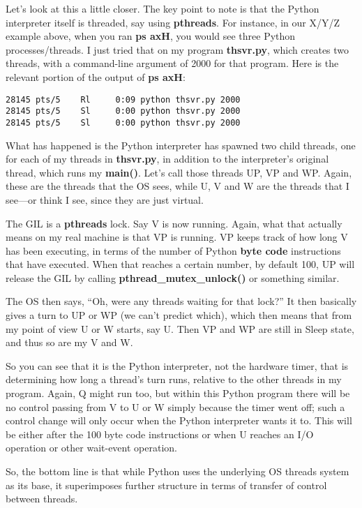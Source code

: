 Let's look at this a little closer.  The key point to note is that the
Python interpreter itself is threaded, say using {\bf pthreads}.  For
instance, in our X/Y/Z example above, when you ran {\bf ps axH}, you
would see three Python processes/threads.  I just tried that on my
program {\bf thsvr.py}, which creates two threads, with a command-line
argument of 2000 for that program.  Here is the relevant portion of the
output of {\bf ps axH}:

\begin{Verbatim}[fontsize=\relsize{-2}]
28145 pts/5    Rl     0:09 python thsvr.py 2000
28145 pts/5    Sl     0:00 python thsvr.py 2000
28145 pts/5    Sl     0:00 python thsvr.py 2000
\end{Verbatim}

What has happened is the Python interpreter has spawned two child
threads, one for each of my threads in {\bf thsvr.py}, in addition to
the interpreter's original thread, which runs my {\bf main()}.  Let's
call those threads UP, VP and WP.  Again, these are the threads that the
OS sees, while U, V and W are the threads that I see---or think I see,
since they are just virtual.

The GIL is a {\bf pthreads} lock.  Say V is now running.  Again, what
that actually means on my real machine is that VP is running.  VP keeps
track of how long V has been executing, in terms of the number of Python
{\bf byte code} instructions that have executed.  When that reaches a
certain number, by default 100, UP will release the GIL by calling {\bf
pthread\_mutex\_unlock()} or something similar.  

The OS then says, ``Oh, were any threads waiting for that lock?''  It
then basically gives a turn to UP or WP (we can't predict which), which
then means that from my point of view U or W starts, say U.  Then VP and
WP are still in Sleep state, and thus so are my V and W.

So you can see that it is the Python interpreter, not the hardware
timer, that is determining how long a thread's turn runs, relative to
the other threads in my program.  Again, Q might run too, but within
this Python program there will be no control passing from V to U or W
simply because the timer went off; such a control change will only occur
when the Python interpreter wants it to.  This will be either after the
100 byte code instructions or when U reaches an I/O operation or other
wait-event operation.

So, the bottom line is that while Python uses the underlying OS threads
system as its base, it superimposes further structure in terms of
transfer of control between threads.

